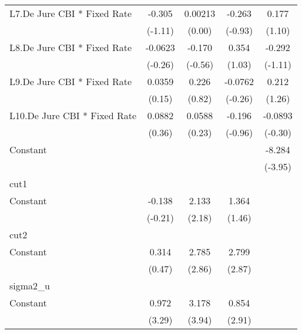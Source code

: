 {\begin{longtable}{l*{4}{c}}
L7.De Jure CBI * Fixed Rate&   -0.305         &  0.00213         &   -0.263         &    0.177         \\
                &  (-1.11)         &   (0.00)         &  (-0.93)         &   (1.10)         \\
[1em]
L8.De Jure CBI * Fixed Rate&  -0.0623         &   -0.170         &    0.354         &   -0.292         \\
                &  (-0.26)         &  (-0.56)         &   (1.03)         &  (-1.11)         \\
[1em]
L9.De Jure CBI * Fixed Rate&   0.0359         &    0.226         &  -0.0762         &    0.212         \\
                &   (0.15)         &   (0.82)         &  (-0.26)         &   (1.26)         \\
[1em]
L10.De Jure CBI * Fixed Rate&   0.0882         &   0.0588         &   -0.196         &  -0.0893         \\
                &   (0.36)         &   (0.23)         &  (-0.96)         &  (-0.30)         \\
[1em]
Constant        &                  &                  &                  &   -8.284\sym{***}\\
                &                  &                  &                  &  (-3.95)         \\
\hline
cut1            &                  &                  &                  &                  \\
Constant        &   -0.138         &    2.133\sym{*}  &    1.364         &                  \\
                &  (-0.21)         &   (2.18)         &   (1.46)         &                  \\
\hline
cut2            &                  &                  &                  &                  \\
Constant        &    0.314         &    2.785\sym{**} &    2.799\sym{**} &                  \\
                &   (0.47)         &   (2.86)         &   (2.87)         &                  \\
\hline
sigma2\_u        &                  &                  &                  &                  \\
Constant        &    0.972\sym{***}&    3.178\sym{***}&    0.854\sym{**} &                  \\
                &   (3.29)         &   (3.94)         &   (2.91)         &                  \\

\end{longtable}}
